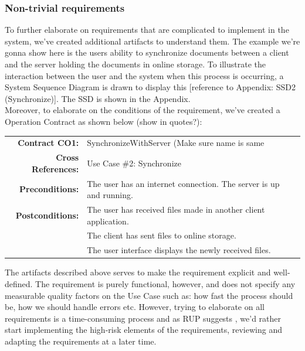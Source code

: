 \subsubsection{Non-trivial requirements}
To further elaborate on requirements that are complicated to implement in the system, we’ve created additional artifacts to understand them. The example we’re gonna show here is the users ability to synchronize documents between a client and the server holding the documents in online storage. To illustrate the interaction between the user and the system when this process is occurring, a System Sequence Diagram is drawn to display this [reference to Appendix: SSD2 (Synchronize)]. The SSD is shown in the Appendix.\\
Moreover, to elaborate on the conditions of the requirement, we’ve created a Operation Contract as shown below (show in quotes?):\\
\begin{table}[ht]\centering
  \begin{tabularx}{\textwidth}{@{}rXXl@{}}\toprule
    \textbf{Contract CO1:} & SynchronizeWithServer (Make sure name is same\\
    \textbf{Cross References:} & Use Case \#2: Synchronize\\
    \textbf{Preconditions:} &  The user has an internet connection. The server is up and running.\\
    \textbf{Postconditions:} & The user has received files made in another client application.\\
    & The client has sent files to online storage.\\
    & The user interface displays the newly received files.\\
    \bottomrule
  \end{tabularx}
\end{table}
The artifacts described above serves to make the requirement explicit and well-defined. The requirement is purely functional, however, and does not specify any measurable quality factors on the Use Case such as: how fast the process should be, how we should handle errors etc. However, trying to elaborate on all requirements is a time-consuming process and as RUP suggests \cite[12.2 p.~196]{OOAD}, we’d rather start implementing the high-risk elements of the requirements, reviewing and adapting the requirements at a later time. \\
